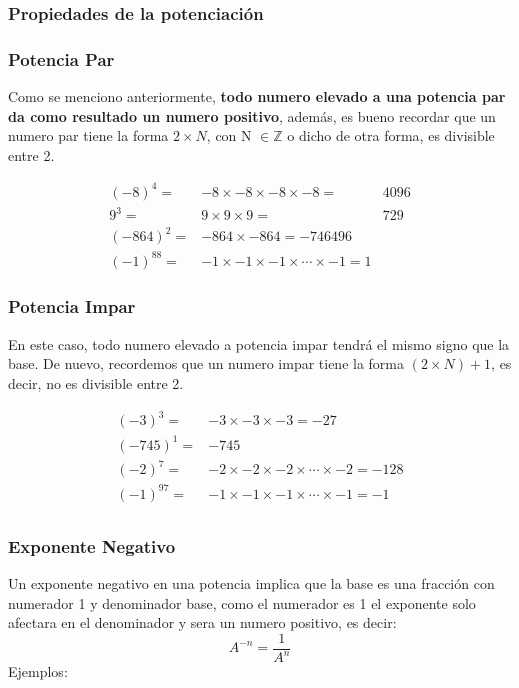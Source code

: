 \documentclass[12pt]{article}
\begin{document}
\subsubsection*{Propiedades de la potenciación}
    \subsubsection*{Potencia Par}
        Como se menciono anteriormente, \textbf{todo numero elevado a una potencia
        par da como resultado un numero positivo}, además, es bueno recordar que
        un numero par tiene la forma $2\times N$, con N $\in \mathbb{Z}$ o dicho
        de otra forma, es divisible entre 2.

        \begin{align*}
            (-8)^{4} =& -8\times-8\times-8\times-8 =& 4096\\
            9^3=& 9\times9\times9 =& 729\\
            (-864)^2  =& -864\times-864 = -746496\\
            (-1)^88 =& -1\times-1\times-1\times \cdots \times -1 = 1
        \end{align*}

    \subsubsection*{Potencia Impar}
        En este caso, todo numero elevado a potencia impar tendrá el mismo signo
        que la base. De nuevo, recordemos que un numero impar tiene la forma
        $(2\times N)+1$, es decir, no es divisible entre 2.

        \begin{align*}
            (-3)^3 =& -3\times-3\times-3 = -27\\
            (-745)^1 =& -745\\
            (-2)^{7} =& -2\times-2\times-2\times \cdots \times -2 = -128\\
            (-1)^{97} =& -1\times -1\times-1\times\cdots\times -1 = -1\\
        \end{align*}


    \subsubsection*{Exponente Negativo}
        Un exponente negativo en una potencia implica que la base es una fracción
        con numerador 1 y denominador base, como el numerador es 1 el exponente
        solo afectara en el denominador y sera un numero positivo, es decir:
        $$A^{-n}= \frac{1}{A^n} $$
        Ejemplos:
\end{document}
